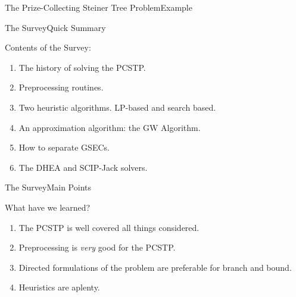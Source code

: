 \documentclass[rgb,dvipsnames]{beamer}
\begin{document}
\begin{frame}{The Prize-Collecting Steiner Tree Problem}{Example}
  \centering

\end{frame}
\begin{frame}{The Survey}{Quick Summary}

  \begin{block}{Contents of the Survey:}
  \begin{enumerate}
  \item The history of solving the PCSTP.
  \item Preprocessing routines.
  \item Two heuristic algorithms. LP-based and search based.
  \item An approximation algorithm: the GW Algorithm.
  \item How to separate GSECs.
  \item The DHEA and SCIP-Jack solvers.
  \end{enumerate}
\end{block}
\end{frame}

\begin{frame}{The Survey}{Main Points}
  \begin{block}{What have we learned?}
    \pause
    \begin{enumerate}
    \item The PCSTP is well covered all things considered. \pause
  \item Preprocessing is \textit{very} good for the PCSTP. \pause
  \item Directed formulations of the problem are preferable for
    branch and bound. \pause
  \item Heuristics are aplenty.
  \end{enumerate}
  \end{block}

\end{frame}
\end{document}

